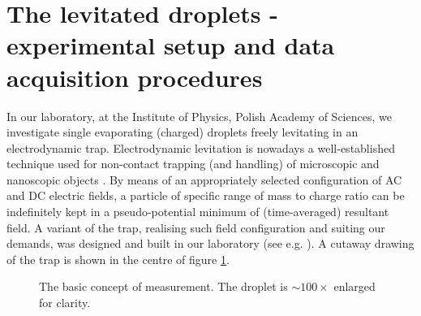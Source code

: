 \documentclass[preprint,review,12pt,dvips]{elsarticle}
\begin{document}
\section{The levitated droplets - experimental setup and data acquisition procedures}
In our laboratory, at the Institute of Physics, Polish Academy of Sciences, we investigate single evaporating (charged)
droplets freely levitating in an electrodynamic trap. Electrodynamic levitation is nowadays a well-established technique
used for non-contact trapping (and handling) of microscopic and nanoscopic objects \cite{Major}. By means of an
appropriately selected configuration of AC and DC electric fields, a particle of specific range of mass to charge ratio
can be indefinitely kept in a pseudo-potential minimum of (time-averaged) resultant field. A variant of the trap,
realising such field configuration and suiting our demands, was designed and built in our laboratory (see e.g.
\cite{RoP}). A cutaway drawing of the trap is shown in the centre of figure \ref{concept}.

\begin{figure}[h!t!b!]
\begin{center}
\end{center}
\caption{The basic concept of measurement. The droplet is $\sim 100\times$ enlarged for clarity.}\label{concept}
\end{figure}
\end{document}
